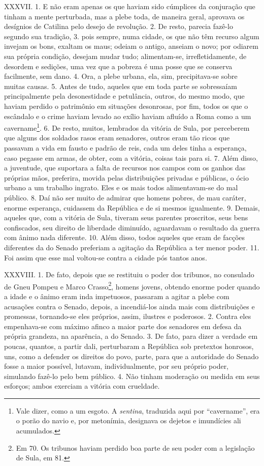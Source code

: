 XXXVII. 1. E não eram apenas os que haviam sido cúmplices da conjuração que
tinham a mente perturbada, mas a plebe toda, de maneira geral, aprovava os
desígnios de Catilina pelo desejo de revolução. 2. De resto, parecia fazê-lo
segundo sua tradição, 3. pois sempre, numa cidade, os que não têm recurso algum
invejam os bons, exaltam os maus; odeiam o antigo, anseiam o novo; por
odiarem sua própria condição, desejam mudar tudo; alimentam-se, irrefletidamente,
de desordem e sedições, uma vez que a pobreza é uma posse que se conserva
facilmente, sem dano. 4. Ora, a plebe urbana, ela, sim, precipitava-se sobre
muitas causas. 5. Antes de tudo, aqueles que em toda parte se sobressaíam
principalmente pela desonestidade e petulância, outros, do mesmo modo, que
haviam perdido o patrimônio em situações desonrosas, por fim, todos os que o
escândalo e o crime haviam levado ao exílio haviam afluído a Roma como a um
cavername\footnote{Vale dizer, como a um esgoto. A \emph{sentina}, traduzida
aqui por ``cavername'', era o porão do navio e, por metonímia, designava os
dejetos e imundícies ali acumulados.}. 6. De resto, muitos, lembrados da
vitória de Sula, por perceberem que alguns dos soldados rasos eram senadores,
outros eram tão ricos que passavam a vida em fausto e padrão de reis, cada um
deles tinha a esperança, caso pegasse em armas, de obter, com a vitória, coisas
tais para si. 7. Além disso, a juventude, que suportara a falta de recursos nos
campos com os ganhos das próprias mãos, preferira, movida pelas distribuições
privadas e públicas, o ócio urbano a um trabalho ingrato. Eles e os mais todos
alimentavam-se do mal público. 8. Daí não ser muito de admirar que homens
pobres, de mau caráter, enorme esperança, cuidassem da República e de si mesmos
igualmente. 9. Demais, aqueles que, com a vitória de Sula, tiveram seus
parentes proscritos, seus bens confiscados, seu direito de liberdade diminuído,
aguardavam o resultado da guerra com ânimo nada diferente. 10. Além disso,
todos aqueles que eram de facções diferentes da do Senado preferiam a agitação
da República a ter menor poder. 11. Foi assim que esse mal voltou-se contra a
cidade pós tantos anos.

XXXVIII. 1. De fato, depois que se restituiu o poder dos tribunos, no consulado
de Gneu Pompeu e Marco Crasso\footnote{Em 70. Os tribunos haviam perdido boa
parte de seu poder com a legislação de Sula, em 81.}, homens jovens, obtendo
enorme poder quando a idade e o ânimo eram inda impetuosos, passaram a agitar a
plebe com acusações contra o Senado, depois, a incendiá-los ainda mais com
distribuições e promessas, tornando-se eles próprios, assim, ilustres e
poderosos. 2. Contra eles empenhava-se com máximo afinco a maior parte dos
senadores em defesa da própria grandeza, na aparência, a do Senado. 3. De fato,
para dizer a verdade em poucas, quantos, a partir dali, perturbaram a República
sob pretextos honrosos, uns, como a defender os direitos do povo, parte, para
que a autoridade do Senado fosse a maior possível, lutavam, individualmente, por seu
próprio poder, simulando fazê-lo pelo bem público. 4. Não tinham moderação ou medida em
seus esforços; ambos exerciam a vitória com crueldade. 

